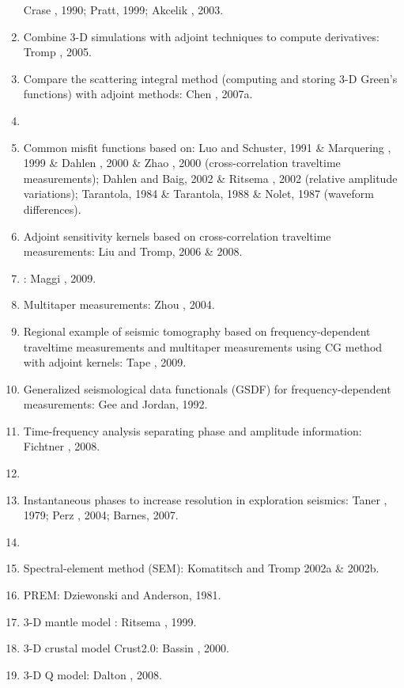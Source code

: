 \begin{enumerate}[\hspace{10mm}*]
    Crase \etal, 1990; Pratt, 1999; Akcelik \etal, 2003.
  \item Combine 3-D simulations with adjoint techniques to compute \Frechet derivatives:
    Tromp \etal, 2005.
  \item Compare the scattering integral method (computing and storing 3-D Green's functions)
    with adjoint methods: Chen \etal, 2007a.
  \item \sline
  \item Common misfit functions based on: Luo and Schuster, 1991 \& Marquering \etal, 1999 \&
    Dahlen \etal, 2000 \& Zhao \etal, 2000 (cross-correlation traveltime measurements);
    Dahlen and Baig, 2002 \& Ritsema \etal, 2002 (relative amplitude variations);
    Tarantola, 1984 \& Tarantola, 1988 \& Nolet, 1987 (waveform differences).
  \item Adjoint sensitivity kernels based on cross-correlation traveltime measurements:
    Liu and Tromp, 2006 \& 2008.
  \item {}
    :
    Maggi \etal, 2009.
  \item Multitaper measurements: Zhou \etal, 2004.
  \item Regional example of seismic tomography based on frequency-dependent traveltime measurements
    and multitaper measurements using CG method with adjoint kernels: Tape \etal, 2009.
  \item Generalized seismological data functionals (GSDF) for frequency-dependent measurements:
    Gee and Jordan, 1992.
  \item Time-frequency analysis separating phase and amplitude information: Fichtner \etal, 2008.
  \item \sline
  \item Instantaneous phases to increase resolution in exploration seismics:
    Taner \etal, 1979; Perz \etal, 2004; Barnes, 2007.
  \item \sline
  \item Spectral-element method (SEM): Komatitsch and Tromp 2002a \& 2002b.
  \item PREM: Dziewonski and Anderson, 1981.
  \item 3-D mantle model 
    :
    Ritsema \etal, 1999.
  \item 3-D crustal model Crust2.0: Bassin \etal, 2000.
  \item 3-D Q model: Dalton \etal, 2008.
\end{enumerate}

